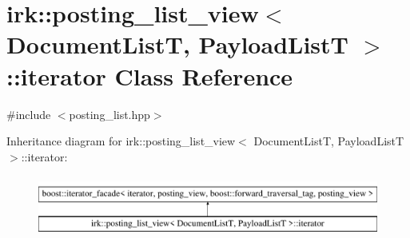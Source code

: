 \hypertarget{classirk_1_1posting__list__view_1_1iterator}{}\section{irk\+:\+:posting\+\_\+list\+\_\+view$<$ Document\+ListT, Payload\+ListT $>$\+:\+:iterator Class Reference}
\label{classirk_1_1posting__list__view_1_1iterator}


{\ttfamily \#include $<$posting\+\_\+list.\+hpp$>$}

Inheritance diagram for irk\+:\+:posting\+\_\+list\+\_\+view$<$ Document\+ListT, Payload\+ListT $>$\+:\+:iterator\+:\begin{figure}[H]
\begin{center}
\leavevmode
\includegraphics[height=2.000000cm]{classirk_1_1posting__list__view_1_1iterator}
\end{center}
\end{figure}
